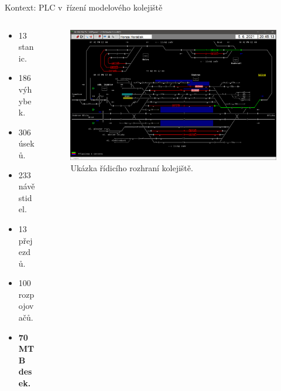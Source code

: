 \documentclass[aspectratio=169]{beamer}
\begin{document}
\begin{frame}{Kontext: PLC v řízení modelového kolejiště}
\begin{columns}
	\begin{column}{.3\textwidth}
		\begin{itemize}
		\item 13 stanic.
		\item 186 výhybek.
		\item 306 úseků.
		\item 233 návěstidel.
		\item 13 přejezdů.
		\item 100 rozpojovačů.
		\item \textbf{70 MTB desek.}
		\end{itemize}
	\end{column}
	\begin{column}{.65\textwidth}
		\begin{figure}
		\includegraphics[width=\columnwidth]{data/sk.png}
		\caption{Ukázka řídicího rozhraní kolejiště.}
		\end{figure}
	\end{column}
\end{columns}
\end{frame}

\end{document}
